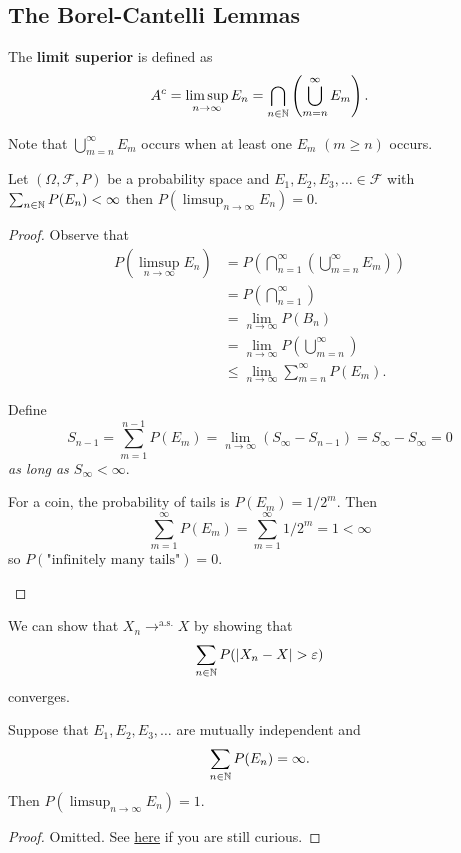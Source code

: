 \subsection{The Borel-Cantelli Lemmas}
\begin{definition}
The \textbf{limit superior} is defined as
$$
A^c=\limsup_{n\to \infty} E_n=\bigcap_{n\in \mathbb N}\left(\bigcup^\infty_{m=n}E_m\right).
$$
\end{definition}
Note that $\bigcup^\infty_{m=n}E_m$ occurs when at least one $E_m$ $(m\geq n)$ occurs.

\begin{theorem}
Let $(\Omega, \mathcal F, P)$ be a probability space and $E_1,E_2,E_3,\ldots\in \mathcal F$ with $\sum_{n\in \mathbb N}P(E_n)<\infty$ then $P(\limsup_{n\to \infty} E_n)=0.$
\end{theorem}
\begin{proof}
Observe that
\begin{align*}
    P(\limsup_{n\to \infty} E_n)&=P\left(\bigcap^\infty_{n=1}\left(\bigcup^\infty_{m=n}E_m\right)\right) \\
    &=P\left(\bigcap^\infty_{n=1}\right) \\
    &=\lim_{n\to \infty}P(B_n) \\
    &= \lim_{n\to \infty}P\left(\bigcup^\infty_{m=n}\right) \\
    &\leq \lim_{n\to \infty}\sum^\infty_{m=n}P(E_m).
\end{align*}

\begin{eg}

Define 
$$S_{n-1}=\sum_{m=1}^{n-1}P(E_m)=\lim_{n\to \infty}(S_\infty-S_{n-1})=S_\infty-S_\infty=0$$
\textit{as long as $S_\infty<\infty$}.

For a coin, the probability of tails is $P(E_m)=1/2^m$. Then
$$
\sum^\infty_{m=1}P(E_m)=\sum^\infty_{m=1}1/2^m=1<\infty
$$
so $P(\text{"infinitely many tails"})=0$.
\end{eg}

\end{proof}
We can show that $X_n\to^{\text{a.s.}}X$ by showing that 
$$
\sum_{n\in \NN}P(|X_n-X|>\epsilon) 
$$
converges.


\begin{theorem}
		Suppose that \phantom{hello! :)} $E_1,E_2,E_3,\ldots$ are mutually independent and
$$
\sum_{n\in \mathbb N} P(E_n)=\infty.
$$
Then $P(\limsup_{n\to \infty} E_n)=1.$
\end{theorem}

\begin{proof}
Omitted. See \href{https://proofwiki.org/wiki/Second_Borel-Cantelli_Lemma}{here} if you are still curious.
\end{proof}